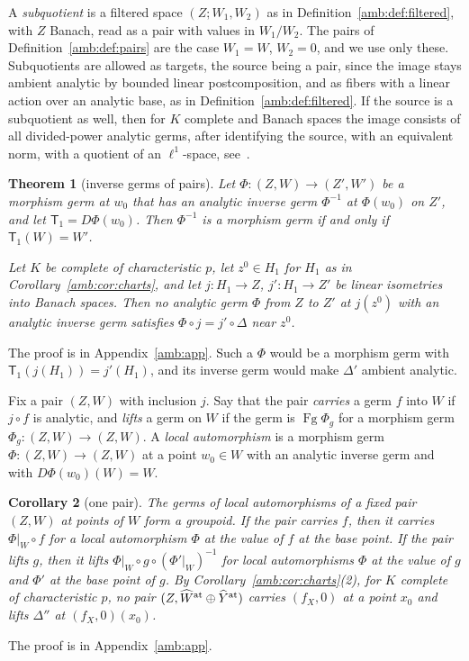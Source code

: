\documentclass[11pt]{amsart}
\newtheorem{theorem}{Theorem}[section]
\newtheorem{corollary}[theorem]{Corollary}
\theoremstyle{definition}
\theoremstyle{remark}
\numberwithin{equation}{section}
\theoremstyle{plain}
\theoremstyle{definition}
\theoremstyle{plain}
\begin{document}
A \emph{subquotient} is a filtered space $(Z;W_1,W_2)$ as in Definition~\ref{amb:def:filtered}, with $Z$ Banach, read as a pair with values in $W_1/W_2$. The pairs of Definition~\ref{amb:def:pairs} are the case $W_1=W$, $W_2=0$, and we use only these. Subquotients are allowed as targets, the source being a pair, since the image stays ambient analytic by bounded linear postcomposition, and as fibers with a linear action over an analytic base, as in Definition~\ref{amb:def:filtered}. If the source is a subquotient as well, then for $K$ complete and Banach spaces the image consists of all divided-power analytic germs, after identifying the source, with an equivalent norm, with a quotient of an $\ell^1$-space, see~\cite{II}.

\begin{theorem}[inverse germs of pairs]\label{amb:thm:pair-inverse}
Let $\Phi\colon(Z,W)\to(Z',W')$ be a morphism germ at $w_0$ that has an analytic inverse germ $\Phi^{-1}$ at $\Phi(w_0)$ on $Z'$, and let $\mathsf T_1=D\Phi(w_0)$. Then $\Phi^{-1}$ is a morphism germ if and only if $\mathsf T_1(W)=W'$.

Let $K$ be complete of characteristic $p$, let $z^0\in H_1$ for $H_1$ as in Corollary~\ref{amb:cor:charts}, and let $j\colon H_1\to Z$, $j'\colon H_1\to Z'$ be linear isometries into Banach spaces. Then no analytic germ $\Phi$ from $Z$ to $Z'$ at $j(z^0)$ with an analytic inverse germ satisfies $\Phi\circ j=j'\circ\Delta$ near $z^0$.
\end{theorem}
The proof is in Appendix~\ref{amb:app}. Such a $\Phi$ would be a morphism germ with $\mathsf T_1(j(H_1))=j'(H_1)$, and its inverse germ would make $\Delta'$ ambient analytic.

Fix a pair $(Z,W)$ with inclusion $j$. Say that the pair \emph{carries} a germ $f$ into $W$ if $j\circ f$ is analytic, and \emph{lifts} a germ on $W$ if the germ is $\operatorname{Fg}\Phi_g$ for a morphism germ $\Phi_g\colon(Z,W)\to(Z,W)$. A \emph{local automorphism} is a morphism germ $\Phi\colon(Z,W)\to(Z,W)$ at a point $w_0\in W$ with an analytic inverse germ and with $D\Phi(w_0)(W)=W$.

\begin{corollary}[one pair]\label{amb:cor:one-pair}
The germs of local automorphisms of a fixed pair $(Z,W)$ at points of $W$ form a groupoid. If the pair carries $f$, then it carries $\Phi|_W\circ f$ for a local automorphism $\Phi$ at the value of $f$ at the base point. If the pair lifts $g$, then it lifts $\Phi|_W\circ g\circ(\Phi'|_W)^{-1}$ for local automorphisms $\Phi$ at the value of $g$ and $\Phi'$ at the base point of $g$. By Corollary~\ref{amb:cor:charts}(2), for $K$ complete of characteristic $p$, no pair $(Z,\widehat W^{\rm at}\oplus\widehat Y^{\rm at})$ carries $(f_X,0)$ at a point $x_0$ and lifts $\Delta''$ at $(f_X,0)(x_0)$.
\end{corollary}
The proof is in Appendix~\ref{amb:app}.
\end{document}
